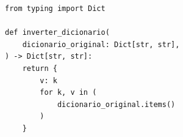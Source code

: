 \ifmostrarGabarito
\begin{verbatim}
from typing import Dict

def inverter_dicionario(
    dicionario_original: Dict[str, str],
) -> Dict[str, str]:
    return {
        v: k
        for k, v in (
            dicionario_original.items()
        )
    }
\end{verbatim}

\fi
